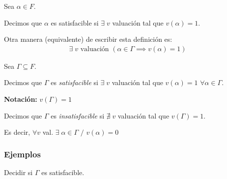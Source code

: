 \begin{definicion}{}{}
    Sea $\alpha \in F$.
    
    \medskip

    Decimos que $\alpha$ es satisfacible si $\exists \; v$ valuación tal que
    $v(\alpha) = 1$.
\end{definicion}

Otra manera (equivalente) de escribir esta definición es:
\begin{gather*}
    \exists \; v \text{ valuación } (\alpha \in \Gamma \implies v(\alpha) = 1)
\end{gather*}

\medskip

\begin{definicion}{}{}
    Sea $\Gamma \subseteq F$.

    \medskip

    Decimos que $\Gamma$ es \textit{satisfacible} si $\exists \; v$ valuación tal que
    $v(\alpha) = 1$ $\forall \alpha \in \Gamma$.

    \bigskip
    \textbf{Notación:}
    $v(\Gamma) = 1$ 

    \medskip

    Decimos que $\Gamma$ es \textit{insatisfacible} si $\nexists \; v$ 
    valuación tal que $v(\Gamma)=1$.

    Es decir, $\forall v$ val. $\exists \; \alpha \in \Gamma$ $/$ $v(\alpha)=0$
\end{definicion}

\subsubsection{Ejemplos}

Decidir si $\Gamma$ es satisfacible.

